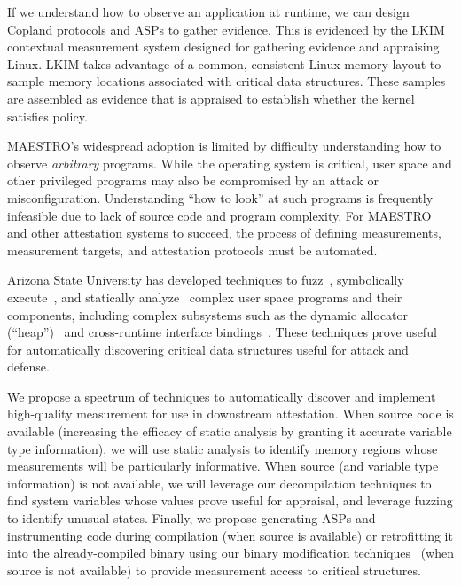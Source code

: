 \documentclass[runningheads]{llncs}
\begin{document}
If we understand how to observe an application at runtime, we can
design Copland protocols and ASPs to gather evidence.  This is
evidenced by the LKIM~\citep{Loscocco:07:Linux-kernel-in} contextual
measurement system designed for gathering evidence and appraising
Linux.  LKIM takes advantage of a common, consistent Linux memory
layout to sample memory locations associated with critical data
structures.  These samples are assembled as evidence that is appraised
to establish whether the kernel satisfies policy.

MAESTRO's widespread adoption is limited by difficulty understanding
how to observe \emph{arbitrary} programs.  While the operating system
is critical, user space and other privileged programs may also be
compromised by an attack or misconfiguration.  Understanding ``how to
look'' at such programs is frequently infeasible due to lack of source
code and program complexity.  For MAESTRO and other attestation
systems to succeed, the process of defining measurements, measurement
targets, and attestation protocols must be automated.

Arizona State University has developed
techniques to fuzz~\citep{trickel2022toss,salls2020exploring,peng2018t}, symbolically execute~\citep{stephens2016driller,shoshitaishvili2016sok}, and statically analyze~\citep{das2022hybrid,vadayath2022arbiter} complex user space programs and their components, including complex subsystems such as the dynamic allocator (``heap'')~\citep{eckert2018heaphopper} and cross-runtime interface bindings~\citep{dinh2021favocado}.
These techniques prove useful for automatically discovering critical data structures useful for attack and defense.

We propose a spectrum of techniques to automatically discover and
implement high-quality measurement for use in downstream attestation.
When source code is available (increasing the efficacy of static analysis by granting it accurate variable type information), we will use static analysis to identify memory regions whose measurements will be particularly informative.
When source (and variable type information) is not available, we will leverage our decompilation techniques to find system variables whose values prove useful for appraisal, and leverage fuzzing to identify unusual states.
Finally, we propose generating ASPs and instrumenting code during compilation (when source is available) or retrofitting it into the already-compiled binary using our binary modification techniques~\citep{wang2017ramblr} (when source is not available) to provide measurement access to critical structures.
\end{document}
